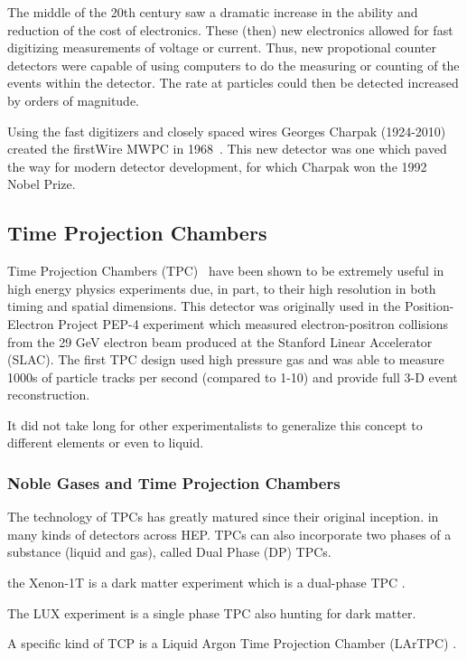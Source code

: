 The middle of the 20th century saw a dramatic increase in the ability and reduction of the cost of electronics.
These (then) new electronics allowed for fast digitizing measurements of voltage or current.
Thus, new propotional counter detectors were capable of using computers to do the measuring or counting of the events within the detector.
The rate at particles could then be detected increased by orders of magnitude.

Using the fast digitizers and closely spaced wires Georges Charpak (1924-2010) created the firstWire MWPC in 1968~\citep{Charpak:1968kd}.
This new detector was one which paved the way for modern detector development, for which Charpak won the 1992 Nobel Prize.


\subsection{Time Projection Chambers}

Time Projection Chambers (TPC)~\citep{lartpc:nygren} have been shown to be extremely useful in high energy physics experiments due, in part, to their high resolution in both timing and spatial dimensions.
This detector was originally used in the Position-Electron Project PEP-4 experiment which measured electron-positron collisions from the 29 GeV electron beam produced at the Stanford Linear Accelerator (SLAC).
The first TPC design used high pressure gas and was able to measure 1000s of particle tracks per second (compared to 1-10) and provide full 3-D event reconstruction.


It did not take long for other experimentalists to generalize this concept to different elements or even to liquid.


\subsubsection{Noble Gases and Time Projection Chambers}

The technology of TPCs has greatly matured since their original inception.
in many kinds of detectors across HEP. TPCs can also incorporate two phases of a substance (liquid and gas), called Dual Phase (DP) TPCs.

the Xenon-1T is a dark matter experiment which is a dual-phase TPC \citep{Aprile_2017_xenon1T}.

The LUX experiment is a single phase TPC also hunting for dark matter.


A specific kind of TCP is a Liquid Argon Time Projection Chamber (LArTPC) \citep{rubbia1977liquid}.

